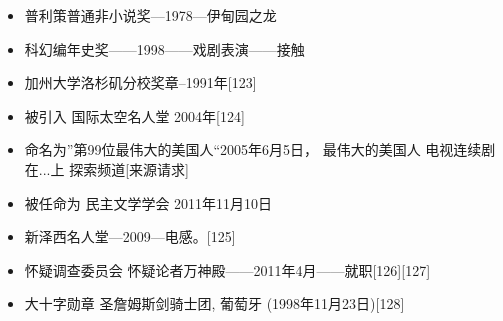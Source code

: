 \begin{itemize}
\item 普利策普通非小说奖—1978—伊甸园之龙
\item 科幻编年史奖——1998——戏剧表演——接触
\item 加州大学洛杉矶分校奖章–1991年[123]
\item 被引入 国际太空名人堂 2004年[124]
\item 命名为”第99位最伟大的美国人“2005年6月5日， 最伟大的美国人 电视连续剧 在...上 探索频道[来源请求]
\item 被任命为 民主文学学会 2011年11月10日
\item 新泽西名人堂—2009—电感。[125]
\item 怀疑调查委员会 怀疑论者万神殿——2011年4月——就职[126][127]
\item 大十字勋章 圣詹姆斯剑骑士团, 葡萄牙 (1998年11月23日)[128]
\end{itemize}
